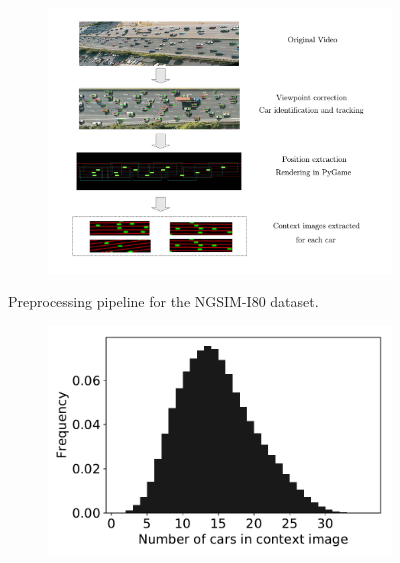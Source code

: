 \documentclass{article}
\begin{document}
\begin{figure}
  \centering
  \begin{subfigure}[b]{0.8\textwidth}
    \includegraphics[width=\textwidth]{images/i80_preprocess.pdf}
  \end{subfigure}
  \caption{Preprocessing pipeline for the NGSIM-I80 dataset.}
\end{figure}



\begin{figure}
  \centering
  \begin{subfigure}[b]{0.5\textwidth}
    \includegraphics[width=\textwidth]{images/car_statistics.pdf}
  \end{subfigure}
  \label{car-statistics}
\end{figure}
\end{document}
